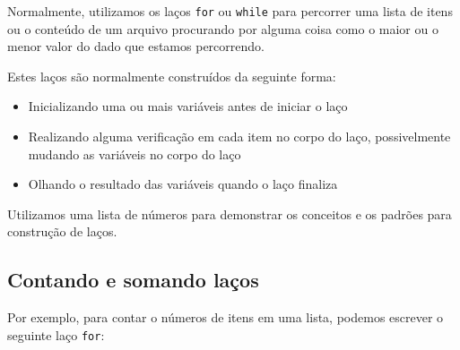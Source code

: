 
Normalmente, utilizamos os laços {\tt for} ou {\tt while} para percorrer
uma lista de itens ou o conteúdo de um arquivo procurando por alguma coisa
como o maior ou o menor valor do dado que estamos percorrendo.


Estes laços são normalmente construídos da seguinte forma:

\begin{itemize}

\item Inicializando uma ou mais variáveis antes de iniciar o laço

\item Realizando alguma verificação em cada item no corpo do laço,
	possivelmente mudando as variáveis no corpo do laço

\item Olhando o resultado das variáveis quando o laço finaliza
\end{itemize}


Utilizamos uma lista de números para demonstrar os conceitos e os padrões
para construção de laços.

\subsection{Contando e somando laços}


Por exemplo, para contar o números de itens em uma lista, podemos escrever
o seguinte laço {\tt for}:

